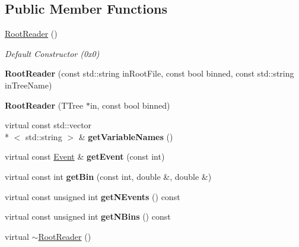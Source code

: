 \subsection*{Public Member Functions}
\begin{DoxyCompactItemize}
\item 
\hypertarget{class_root_reader_a6f966c844aa3c2ac4fd3fe482586f827}{\hyperlink{class_root_reader_a6f966c844aa3c2ac4fd3fe482586f827}{Root\-Reader} ()}\label{class_root_reader_a6f966c844aa3c2ac4fd3fe482586f827}

\begin{DoxyCompactList}\small\item\em Default Constructor (0x0) \end{DoxyCompactList}\item 
\hypertarget{class_root_reader_af10d9979564e164fdd8085e3a7a8f473}{{\bfseries Root\-Reader} (const std\-::string in\-Root\-File, const bool binned, const std\-::string in\-Tree\-Name)}\label{class_root_reader_af10d9979564e164fdd8085e3a7a8f473}

\item 
\hypertarget{class_root_reader_a8fc5355f55d3f207ceca793df2ba3a07}{{\bfseries Root\-Reader} (T\-Tree $\ast$in, const bool binned)}\label{class_root_reader_a8fc5355f55d3f207ceca793df2ba3a07}

\item 
\hypertarget{class_root_reader_a1459a5bdb157ec3794c7f83c48456479}{virtual const std\-::vector\\*
$<$ std\-::string $>$ \& {\bfseries get\-Variable\-Names} ()}\label{class_root_reader_a1459a5bdb157ec3794c7f83c48456479}

\item 
\hypertarget{class_root_reader_a9abb0aca839119eaa81c07da411813cf}{virtual const \hyperlink{class_event}{Event} \& {\bfseries get\-Event} (const int)}\label{class_root_reader_a9abb0aca839119eaa81c07da411813cf}

\item 
\hypertarget{class_root_reader_ab4b78926472a13be4ae08e648fe70f15}{virtual const int {\bfseries get\-Bin} (const int, double \&, double \&)}\label{class_root_reader_ab4b78926472a13be4ae08e648fe70f15}

\item 
\hypertarget{class_root_reader_a035727b2548547a0c1b84bdf3799ab37}{virtual const unsigned int {\bfseries get\-N\-Events} () const }\label{class_root_reader_a035727b2548547a0c1b84bdf3799ab37}

\item 
\hypertarget{class_root_reader_a46c7618bb5376827c62e9c8e746a0cb2}{virtual const unsigned int {\bfseries get\-N\-Bins} () const }\label{class_root_reader_a46c7618bb5376827c62e9c8e746a0cb2}

\item 
virtual \hyperlink{class_root_reader_a926a707698e8f61dd3de1d2b329dd6a2}{$\sim$\-Root\-Reader} ()
\end{DoxyCompactItemize}
